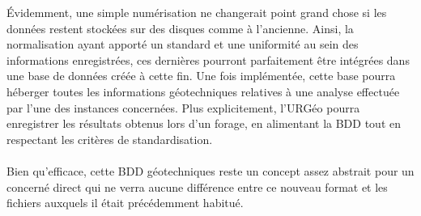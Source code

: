 \par
Évidemment, une simple numérisation ne changerait point grand chose 
si les données restent stockées sur des disques comme à l'ancienne. Ainsi, 
la normalisation ayant apporté un standard et une uniformité au sein des informations 
enregistrées, ces dernières pourront parfaitement être intégrées dans 
une base de données créée à cette fin. Une fois implémentée, cette 
base pourra héberger toutes les informations géotechniques relatives 
à une analyse effectuée par l'une des instances concernées. Plus 
explicitement, l'URGéo pourra enregistrer les résultats obtenus lors 
d'un forage, en alimentant la BDD tout en respectant les critères de 
standardisation.
\paragraph{}
Bien qu'efficace, cette BDD géotechniques reste un concept assez 
abstrait pour un concerné direct qui ne verra aucune différence 
entre ce nouveau format et les fichiers auxquels il était 
précédemment habitué.